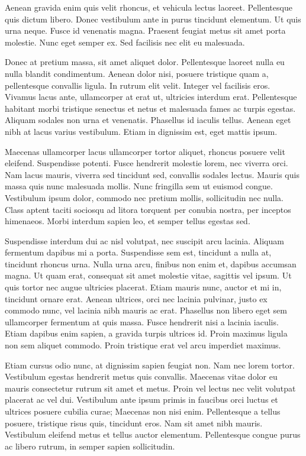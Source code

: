 \documentclass{article}
\begin{document}
Aenean gravida enim quis velit rhoncus, et vehicula lectus laoreet. Pellentesque quis dictum libero. Donec vestibulum ante in purus tincidunt elementum. Ut quis urna neque. Fusce id venenatis magna. Praesent feugiat metus sit amet porta molestie. Nunc eget semper ex. Sed facilisis nec elit eu malesuada.

Donec at pretium massa, sit amet aliquet dolor. Pellentesque laoreet nulla eu nulla blandit condimentum. Aenean dolor nisi, posuere tristique quam a, pellentesque convallis ligula. In rutrum elit velit. Integer vel facilisis eros. Vivamus lacus ante, ullamcorper at erat ut, ultricies interdum erat. Pellentesque habitant morbi tristique senectus et netus et malesuada fames ac turpis egestas. Aliquam sodales non urna et venenatis. Phasellus id iaculis tellus. Aenean eget nibh at lacus varius vestibulum. Etiam in dignissim est, eget mattis ipsum.

Maecenas ullamcorper lacus ullamcorper tortor aliquet, rhoncus posuere velit eleifend. Suspendisse potenti. Fusce hendrerit molestie lorem, nec viverra orci. Nam lacus mauris, viverra sed tincidunt sed, convallis sodales lectus. Mauris quis massa quis nunc malesuada mollis. Nunc fringilla sem ut euismod congue. Vestibulum ipsum dolor, commodo nec pretium mollis, sollicitudin nec nulla. Class aptent taciti sociosqu ad litora torquent per conubia nostra, per inceptos himenaeos. Morbi interdum sapien leo, et semper tellus egestas sed.

Suspendisse interdum dui ac nisl volutpat, nec suscipit arcu lacinia. Aliquam fermentum dapibus mi a porta. Suspendisse sem est, tincidunt a nulla at, tincidunt rhoncus urna. Nulla urna arcu, finibus non enim et, dapibus accumsan magna. Ut quam erat, consequat sit amet molestie vitae, sagittis vel ipsum. Ut quis tortor nec augue ultricies placerat. Etiam mauris nunc, auctor et mi in, tincidunt ornare erat. Aenean ultrices, orci nec lacinia pulvinar, justo ex commodo nunc, vel lacinia nibh mauris ac erat. Phasellus non libero eget sem ullamcorper fermentum at quis massa. Fusce hendrerit nisi a lacinia iaculis. Etiam dapibus enim sapien, a gravida turpis ultrices id. Proin maximus ligula non sem aliquet commodo. Proin tristique erat vel arcu imperdiet maximus.

Etiam cursus odio nunc, at dignissim sapien feugiat non. Nam nec lorem tortor. Vestibulum egestas hendrerit metus quis convallis. Maecenas vitae dolor eu mauris consectetur rutrum sit amet et metus. Proin vel lectus nec velit volutpat placerat ac vel dui. Vestibulum ante ipsum primis in faucibus orci luctus et ultrices posuere cubilia curae; Maecenas non nisi enim. Pellentesque a tellus posuere, tristique risus quis, tincidunt eros. Nam sit amet nibh mauris. Vestibulum eleifend metus et tellus auctor elementum. Pellentesque congue purus ac libero rutrum, in semper sapien sollicitudin.
\end{document}
